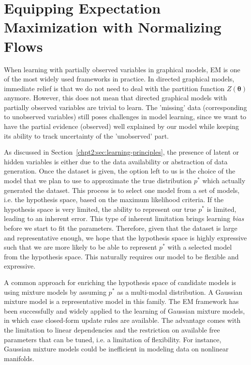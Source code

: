 \chapter{Equipping Expectation Maximization with Normalizing Flows}
\label{chpt6:em-flow}
\graphicspath{{source/chapter6/}}

When learning with partially observed variables in graphical models, EM is one of the most widely used frameworks in practice. In directed graphical models, immediate relief is that we do not need to deal with the partition function $Z(\bm{\theta})$ anymore. However, this does not mean that directed graphical models with partially observed variables are trivial to learn. The 'missing' data (corresponding to unobserved variables) still poses challenges in model learning, since we want to have the partial evidence (observed) well explained by our model while keeping its ability to track uncertainty of the 'unobserved' part.

As discussed in Section~\ref{chpt2:sec:learning-principles}, the presence of latent or hidden variables is either due to the data availability or abstraction of data generation. Once the dataset is given, the option left to us is the choice of the model that we plan to use to approximate the true distribution $p^{\ast}$ which actually generated the dataset. This process is to select one model from a set of models, i.e. the hypothesis space, based on the maximum likelihood criteria. If the hypothesis space is very limited, the ability to represent our true $p^{\ast}$ is limited, leading to an inherent error. This type of inherent limitation brings learning \textit{bias} before we start to fit the parameters.
Therefore, given that the dataset is large and representative enough, we hope that the hypothesis space is highly expressive such that we are more likely to be able to represent $p^{\ast}$ with a selected model from the hypothesis space. This naturally requires our model to be flexible and expressive.

A common approach for enriching the hypothesis space of candidate models is using mixture models by assuming $p^{\ast}$ as a multi-modal distribution. A Gaussian mixture model is a representative model in this family. The EM framework has been successfully and widely applied to the learning of Gaussian mixture models, in which case closed-form update rules are available. The advantage comes with the limitation to linear dependencies and the restriction on available free parameters that can be tuned, i.e. a limitation of flexibility. For instance, Gaussian mixture models could be inefficient in modeling data on nonlinear manifolds. 

